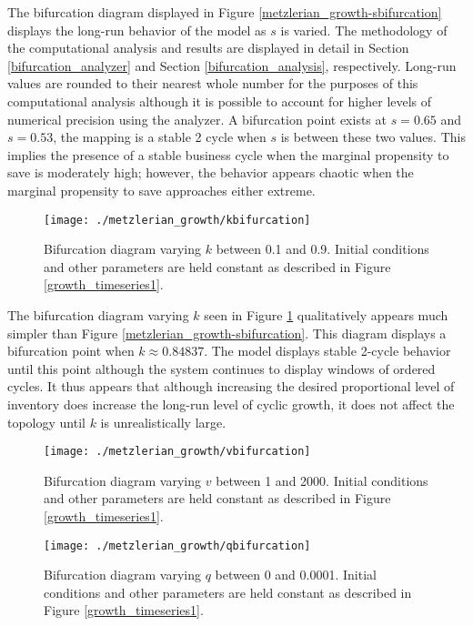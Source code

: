 The bifurcation diagram displayed in Figure \ref{metzlerian_growth-sbifurcation} displays the long-run behavior of the model as $s$ is varied. The methodology of the computational analysis and results are displayed in detail in Section \ref{bifurcation_analyzer} and Section \ref{bifurcation_analysis}, respectively. Long-run values are rounded to their nearest whole number for the purposes of this computational analysis although it is possible to account for higher levels of numerical precision using the analyzer. A bifurcation point exists at $s=0.65$ and $s=0.53$, the mapping is a stable 2 cycle when $s$ is between these two values. This implies the presence of a stable business cycle when the marginal propensity to save is moderately high; however, the behavior appears chaotic when the marginal propensity to save approaches either extreme. 

\begin{figure}
    \centering
    \texttt{[image: ./metzlerian\_growth/kbifurcation]}
    \caption{Bifurcation diagram varying $k$ between 0.1 and 0.9. Initial conditions and other parameters are held constant as described in Figure \ref{growth_timeseries1}.}
    \label{metzlerian_growth-kbifurcation}
\end{figure}

The bifurcation diagram varying $k$ seen in Figure \ref{metzlerian_growth-kbifurcation} qualitatively appears much simpler than Figure \ref{metzlerian_growth-sbifurcation}. This diagram displays a bifurcation point when $k\approx 0.84837$. The model displays stable 2-cycle behavior until this point although the system continues to display windows of ordered cycles. It thus appears that although increasing the desired proportional level of inventory does increase the long-run level of cyclic growth, it does not affect the topology until $k$ is unrealistically large. 

\begin{figure}
    \centering
    \texttt{[image: ./metzlerian\_growth/vbifurcation]}
    \caption{Bifurcation diagram varying $v$ between 1 and 2000. Initial conditions and other parameters are held constant as described in Figure \ref{growth_timeseries1}.}
    \label{metzlerian_growth-vbifurcation}
\end{figure}
\begin{figure}
    \centering
    \texttt{[image: ./metzlerian\_growth/qbifurcation]}
    \caption{Bifurcation diagram varying $q$ between 0 and 0.0001. Initial conditions and other parameters are held constant as described in Figure \ref{growth_timeseries1}.}
    \label{metzlerian_growth-qbifurcation}
\end{figure}

